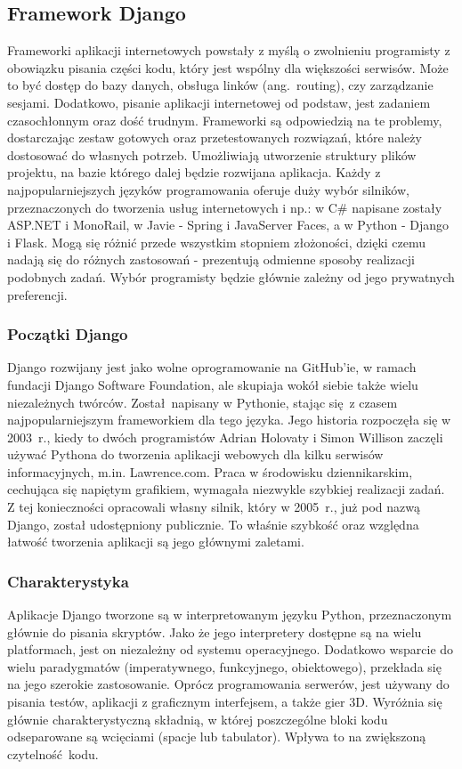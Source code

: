 \subsection{Framework Django}
Frameworki aplikacji internetowych powstały z myślą o zwolnieniu programisty z obowiązku pisania części kodu, który jest wspólny dla większości serwisów. Może to być dostęp do bazy danych, obsługa linków (ang.~routing), czy zarządzanie sesjami. Dodatkowo, pisanie aplikacji internetowej od podstaw, jest zadaniem czasochłonnym oraz dość trudnym. Frameworki są odpowiedzią na te problemy, dostarczając zestaw gotowych oraz przetestowanych rozwiązań, które należy dostosować do własnych potrzeb. Umożliwiają utworzenie struktury plików projektu, na bazie którego dalej będzie rozwijana aplikacja. Każdy z najpopularniejszych języków programowania oferuje duży wybór silników, przeznaczonych do tworzenia usług internetowych i np.: w C\# napisane zostały ASP.NET i MonoRail, w Javie - Spring i JavaServer Faces, a w Python - Django i Flask. Mogą się różnić przede wszystkim stopniem złożoności, dzięki czemu nadają się do różnych zastosowań - prezentują odmienne sposoby realizacji podobnych zadań. Wybór programisty będzie głównie zależny od jego prywatnych preferencji.

\subsubsection*{Początki Django}
Django rozwijany jest jako wolne oprogramowanie na GitHub'ie, w ramach fundacji Django Software Foundation, ale skupiaja wokół siebie także wielu niezależnych twórców. Został napisany w Pythonie, stając się z czasem najpopularniejszym frameworkiem dla tego języka. Jego historia rozpoczęła się w 2003~r., kiedy to dwóch programistów Adrian Holovaty i Simon Willison zaczęli używać Pythona do tworzenia aplikacji webowych dla kilku serwisów informacyjnych, m.in. Lawrence.com. Praca w środowisku dziennikarskim, cechująca się napiętym grafikiem, wymagała niezwykle szybkiej realizacji zadań. Z tej konieczności opracowali własny silnik, który w 2005~r., już pod nazwą Django, został udostępniony publicznie. To właśnie szybkość oraz względna łatwość tworzenia aplikacji są jego głównymi zaletami.

\subsubsection*{Charakterystyka}

Aplikacje Django tworzone są w interpretowanym języku Python, przeznaczonym głównie do pisania skryptów. Jako że jego interpretery dostępne są na wielu platformach, jest on niezależny od systemu operacyjnego. Dodatkowo wsparcie do wielu paradygmatów (imperatywnego, funkcyjnego, obiektowego), przekłada się na jego szerokie zastosowanie. Oprócz programowania serwerów, jest używany do pisania testów, aplikacji z graficznym interfejsem, a także gier 3D. Wyróżnia się głównie charakterystyczną składnią, w której poszczególne bloki kodu odseparowane są wcięciami (spacje lub tabulator). Wpływa to na zwiększoną czytelność kodu.

